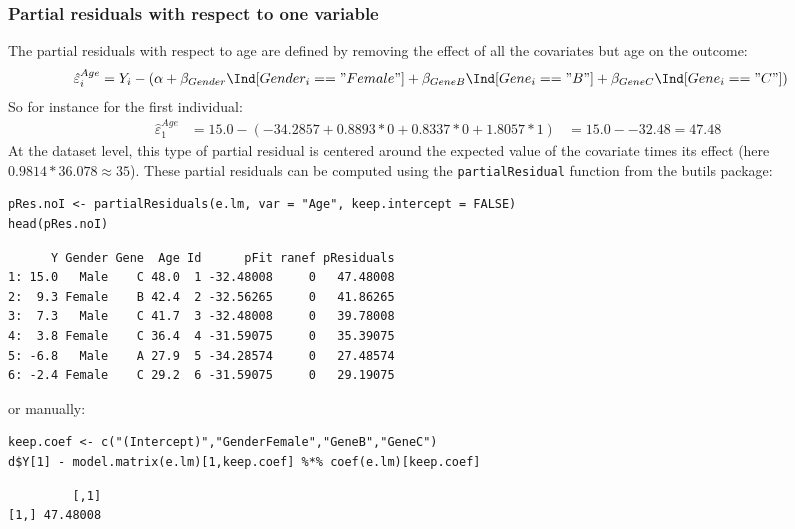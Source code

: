 \documentclass{article}
\begin{document}
\subsubsection{Partial residuals with respect to one variable}
\label{sec:org4debbce}

The partial residuals with respect to age are defined by removing the
effect of all the covariates but age on the outcome:
\begin{align*}
\hat{\varepsilon}^{Age}_i &= Y_i - \left(\alpha + \beta_{Gender} \Ind[Gender_i=="Female"] + \beta_{GeneB} \Ind[Gene_i=="B"] + \beta_{GeneC} \Ind[Gene_i=="C"]\right)
\end{align*}
So for instance for the first individual:
\begin{align*}
\hat{\varepsilon}^{Age}_1 &= 15.0 - \left(-34.2857 + 0.8893 * 0 + 0.8337 * 0 + 1.8057 * 1\right)
                         &= 15.0 - -32.48 = 47.48
\end{align*}
At the dataset level, this type of partial residual is centered around
the expected value of the covariate times its effect (here
\(0.9814*36.078 \approx 35\)). These partial residuals can be
computed using the \texttt{partialResidual} function from the butils package:
\lstset{language=r,label= ,caption= ,captionpos=b,numbers=none}
\begin{lstlisting}
pRes.noI <- partialResiduals(e.lm, var = "Age", keep.intercept = FALSE)
head(pRes.noI)
\end{lstlisting}

\begin{verbatim}
      Y Gender Gene  Age Id      pFit ranef pResiduals
1: 15.0   Male    C 48.0  1 -32.48008     0   47.48008
2:  9.3 Female    B 42.4  2 -32.56265     0   41.86265
3:  7.3   Male    C 41.7  3 -32.48008     0   39.78008
4:  3.8 Female    C 36.4  4 -31.59075     0   35.39075
5: -6.8   Male    A 27.9  5 -34.28574     0   27.48574
6: -2.4 Female    C 29.2  6 -31.59075     0   29.19075
\end{verbatim}

or manually:
\lstset{language=r,label= ,caption= ,captionpos=b,numbers=none}
\begin{lstlisting}
keep.coef <- c("(Intercept)","GenderFemale","GeneB","GeneC")
d$Y[1] - model.matrix(e.lm)[1,keep.coef] %*% coef(e.lm)[keep.coef]
\end{lstlisting}

\begin{verbatim}
         [,1]
[1,] 47.48008
\end{verbatim}
\end{document}

